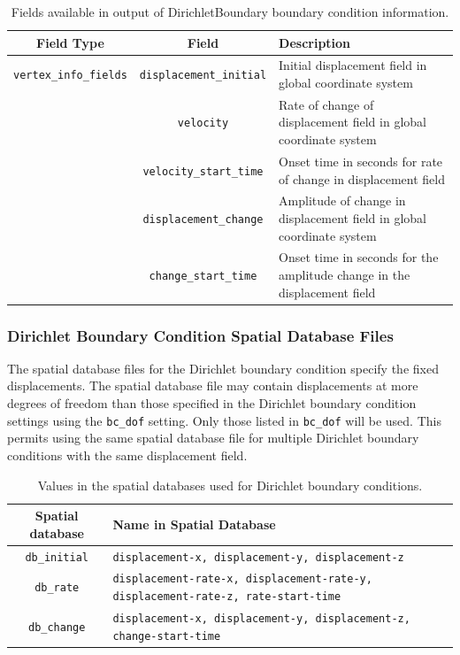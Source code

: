 \noindent \begin{center}
\begin{table}[H]
\noindent \centering{}\caption{\label{tab:dirichlet:output}Fields available in output of DirichletBoundary
boundary condition information.}
\medskip{}
\begin{tabular}{|c|c|>{\centering}p{3in}|}
\hline 
\textbf{Field Type} & \textbf{Field} & \textbf{Description}\tabularnewline
\hline 
\hline 
\texttt{vertex\_info\_fields} & \texttt{displacement\_initial} & Initial displacement field in global coordinate system\tabularnewline
\cline{2-3} 
 & \texttt{velocity} & Rate of change of displacement field in global coordinate system\tabularnewline
\cline{2-3} 
 & \texttt{velocity\_start\_time} & Onset time in seconds for rate of change in displacement field\tabularnewline
\cline{2-3} 
 & \texttt{displacement\_change} & Amplitude of change in displacement field in global coordinate system\tabularnewline
\cline{2-3} 
 & \texttt{change\_start\_time} & Onset time in seconds for the amplitude change in the displacement
field\tabularnewline
\hline 
\end{tabular}
\end{table}

\par\end{center}


\subsubsection{Dirichlet Boundary Condition Spatial Database Files}

The spatial database files for the Dirichlet boundary condition specify
the fixed displacements. The spatial database file may contain displacements
at more degrees of freedom than those specified in the Dirichlet boundary
condition settings using the \texttt{bc\_dof} setting. Only those
listed in \texttt{bc\_dof} will be used. This permits using the same
spatial database file for multiple Dirichlet boundary conditions with
the same displacement field.

\noindent \begin{center}
\begin{table}[H]
\noindent \centering{}\caption{Values in the spatial databases used for Dirichlet boundary conditions.}
\medskip{}
\begin{tabular}{|c|>{\centering}p{4in}|}
\hline 
\textbf{Spatial database} & \textbf{Name in Spatial Database}\tabularnewline
\hline 
\hline 
\texttt{db\_initial} & \texttt{displacement-x, displacement-y, displacement-z}\tabularnewline
\hline 
\texttt{db\_rate} & \texttt{displacement-rate-x, displacement-rate-y, displacement-rate-z,
rate-start-time}\tabularnewline
\hline 
\texttt{db\_change} & \texttt{displacement-x, displacement-y, displacement-z, change-start-time}\tabularnewline
\hline 
\end{tabular}
\end{table}

\par\end{center}


